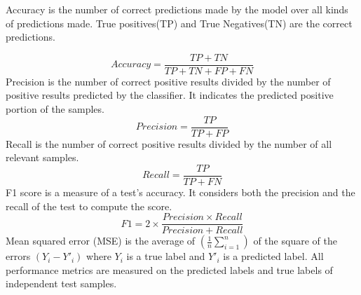 \documentclass{bioinfo}
\begin{document}
Accuracy is the number of correct predictions made by the model over all kinds of predictions made. 
True positives(TP) and True Negatives(TN) are the correct predictions. 

    \begin{equation}
        Accuracy = \frac{TP+TN}{TP+TN+FP+FN}
    \end{equation}
    Precision is the number of correct positive results divided by the number of positive results predicted by the classifier. It indicates the predicted positive portion of the samples. 
    \begin{equation}
        Precision = \frac{TP}{TP+FP}
    \end{equation}
    Recall is the number of correct positive results divided by the number of all relevant samples.
    \begin{equation}
        Recall = \frac{TP}{TP+FN}
    \end{equation}
	F1 score is a measure of a test's accuracy. It considers both the precision and the recall of the test to compute the score.
	\begin{equation}
        F1 = 2 \times \frac{Precision \times Recall}{Precision + Recall}
    \end{equation}
    Mean squared error (MSE) is the average of $(\frac{1}{n} \sum _{i=1} ^n)$ of the square of the errors $(Y_i - Y'_i)$ where $Y_i$ is a true label and $Y'_i$ is a predicted label. All performance metrics are measured on the predicted labels and true labels of independent test samples. 
\end{document}
